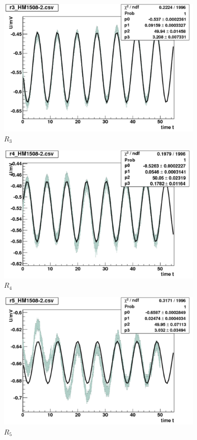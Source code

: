 \begin{appendix}
\begin{figure}[H]
	\centering \includegraphics[width=0.9\textwidth]{Auswertung/Widerstaende/r3.pdf}
	\caption{$R_3$}
\end{figure}

\begin{figure}[H]
	\centering \includegraphics[width=0.9\textwidth]{Auswertung/Widerstaende/r4.pdf}
	\caption{$R_4$}
\end{figure}

\begin{figure}[H]
	\centering \includegraphics[width=0.9\textwidth]{Auswertung/Widerstaende/r5.pdf}
	\caption{$R_5$}
\end{figure}


\end{appendix}
